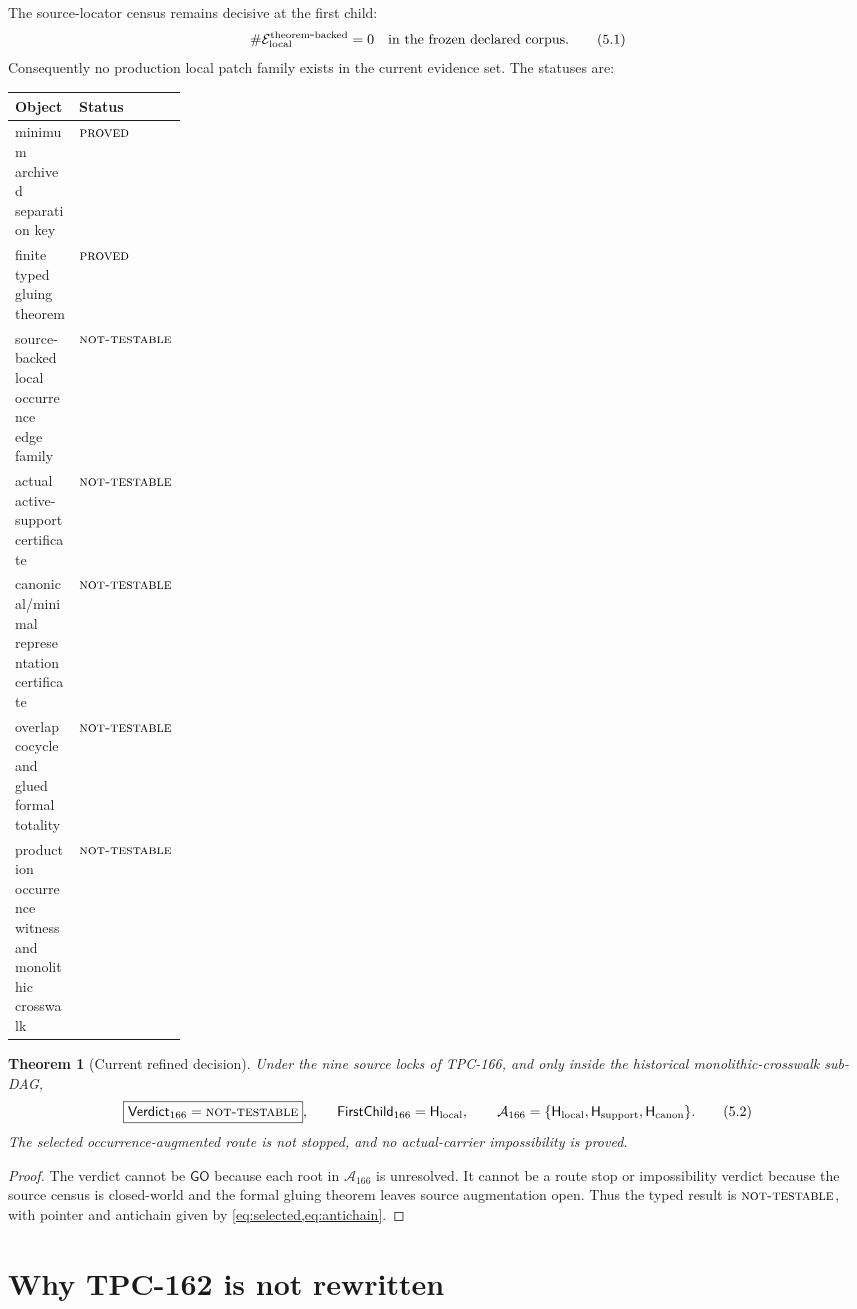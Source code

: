 \documentclass[11pt]{article}
\newtheorem{theorem}{Theorem}[section]
\theoremstyle{definition}
\theoremstyle{remark}
\newcommand{\NT}{\textnormal{\textsc{not-testable}}}
\newcommand{\PROVED}{\textnormal{\textsc{proved}}}
\newcommand{\Hlocal}{\mathsf H_{\rm local}}
\newcommand{\Hsupport}{\mathsf H_{\rm support}}
\newcommand{\Hcanon}{\mathsf H_{\rm canon}}
\begin{document}
The source-locator census remains decisive at the first child:
\[
 \#\mathcal E_{\rm local}^{\rm theorem\mbox{-}backed}=0
 \quad\text{in the frozen declared corpus}.
 \tag{5.1}\label{eq:zero-local}
\]
Consequently no production local patch family exists in the current
evidence set.  The statuses are:
\begin{center}
\begin{tabularx}{0.96\linewidth}{@{}Y P{0.2\linewidth}@{}}
\toprule
\textbf{Object} & \textbf{Status}\\
\midrule
minimum archived separation key & \(\PROVED\)\\
finite typed gluing theorem & \(\PROVED\)\\
source-backed local occurrence edge family & \(\NT\)\\
actual active-support certificate & \(\NT\)\\
canonical/minimal representation certificate & \(\NT\)\\
overlap cocycle and glued formal totality & \(\NT\)\\
production occurrence witness and monolithic crosswalk & \(\NT\)\\
\bottomrule
\end{tabularx}
\end{center}

\begin{theorem}[Current refined decision]\label{thm:decision}
Under the nine source locks of TPC-166, and only inside the historical
monolithic-crosswalk sub-DAG,
\[
 \boxed{\mathsf{Verdict}_{166}=\NT},
 \qquad
 \mathsf{FirstChild}_{166}=\Hlocal,
 \qquad
 \mathcal A_{166}
 =\{\Hlocal,\Hsupport,\Hcanon\}.
 \tag{5.2}\label{eq:decision}
\]
The selected occurrence-augmented route is not stopped, and no
actual-carrier impossibility is proved.
\end{theorem}

\begin{proof}
The verdict cannot be \(\mathsf{GO}\) because each root in
\(\mathcal A_{166}\) is unresolved.  It cannot be a route stop or
impossibility verdict because the source census is closed-world and
the formal gluing theorem leaves source augmentation open.  Thus the
typed result is \(\NT\), with pointer and antichain given by
\cref{eq:selected,eq:antichain}.
\end{proof}

\section{Why TPC-162 is not rewritten}
\end{document}
